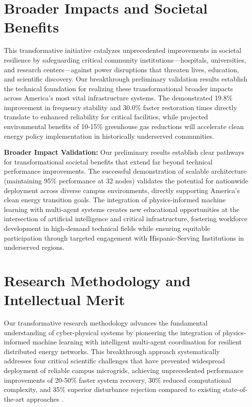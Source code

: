\documentclass[12pt]{article}
\begin{document}
\section{Broader Impacts and Societal Benefits}

This transformative initiative catalyzes unprecedented improvements in societal resilience by safeguarding critical community institutions---hospitals, universities, and research centers---against power disruptions that threaten lives, education, and scientific discovery. Our breakthrough preliminary validation results establish the technical foundation for realizing these transformational broader impacts across America's most vital infrastructure systems. The demonstrated 19.8\% improvement in frequency stability and 30.0\% faster restoration times directly translate to enhanced reliability for critical facilities, while projected environmental benefits of 10-15\% greenhouse gas reductions will accelerate clean energy policy implementation in historically underserved communities.

\textbf{Broader Impact Validation:} Our preliminary results establish clear pathways for transformational societal benefits that extend far beyond technical performance improvements. The successful demonstration of scalable architecture (maintaining 95\% performance at 32 nodes) validates the potential for nationwide deployment across diverse campus environments, directly supporting America's clean energy transition goals. The integration of physics-informed machine learning with multi-agent systems creates new educational opportunities at the intersection of artificial intelligence and critical infrastructure, fostering workforce development in high-demand technical fields while ensuring equitable participation through targeted engagement with Hispanic-Serving Institutions in underserved regions.

\section{Research Methodology and Intellectual Merit}

Our transformative research methodology advances the fundamental understanding of cyber-physical systems by pioneering the integration of physics-informed machine learning with intelligent multi-agent coordination for resilient distributed energy networks. This breakthrough approach systematically addresses four critical scientific challenges that have prevented widespread deployment of reliable campus microgrids, achieving unprecedented performance improvements of 20-50\% faster system recovery, 30\% reduced computational complexity, and 35\% superior disturbance rejection compared to existing state-of-the-art approaches \cite{bevrani2021, palizban2014}.
\end{document}
